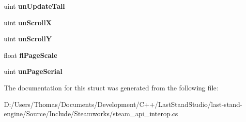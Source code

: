 \begin{DoxyCompactItemize}
\item 
\hypertarget{structValve_1_1Steamworks_1_1HTML__NeedsPaint__t_a1f557924e92c2d236e9ea7b681f3e3e4}{}uint {\bfseries un\+Update\+Tall}\label{structValve_1_1Steamworks_1_1HTML__NeedsPaint__t_a1f557924e92c2d236e9ea7b681f3e3e4}

\item 
\hypertarget{structValve_1_1Steamworks_1_1HTML__NeedsPaint__t_a41aef0410020e540d90f7acaa7f7a808}{}uint {\bfseries un\+Scroll\+X}\label{structValve_1_1Steamworks_1_1HTML__NeedsPaint__t_a41aef0410020e540d90f7acaa7f7a808}

\item 
\hypertarget{structValve_1_1Steamworks_1_1HTML__NeedsPaint__t_a00f9150a4fa4f6ea9f5d05f728a7ca55}{}uint {\bfseries un\+Scroll\+Y}\label{structValve_1_1Steamworks_1_1HTML__NeedsPaint__t_a00f9150a4fa4f6ea9f5d05f728a7ca55}

\item 
\hypertarget{structValve_1_1Steamworks_1_1HTML__NeedsPaint__t_a5270535de39bc1ff0bd5ae964b76a97c}{}float {\bfseries fl\+Page\+Scale}\label{structValve_1_1Steamworks_1_1HTML__NeedsPaint__t_a5270535de39bc1ff0bd5ae964b76a97c}

\item 
\hypertarget{structValve_1_1Steamworks_1_1HTML__NeedsPaint__t_a6709bf316f97d90b7d0a7f1c2f9add5c}{}uint {\bfseries un\+Page\+Serial}\label{structValve_1_1Steamworks_1_1HTML__NeedsPaint__t_a6709bf316f97d90b7d0a7f1c2f9add5c}

\end{DoxyCompactItemize}


The documentation for this struct was generated from the following file\+:\begin{DoxyCompactItemize}
\item 
D\+:/\+Users/\+Thomas/\+Documents/\+Development/\+C++/\+Last\+Stand\+Studio/last-\/stand-\/engine/\+Source/\+Include/\+Steamworks/steam\+\_\+api\+\_\+interop.\+cs\end{DoxyCompactItemize}
